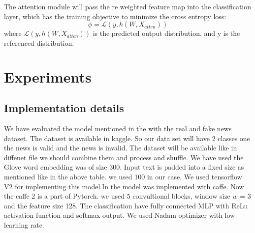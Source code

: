\documentclass{MX2020}
\begin{document}
The attention module will pass the re weighted feature map into the classification layer, which has the training objective to minimize the cross entropy loss: \[\phi = \mathcal{L}(y,h(W, X_{atten}))\]
where \(\mathcal{L}(y,h(W, X_{atten}))\) is the predicted output distribution, and y is the referenced distribution. 

\vspace*{10pt}
\section{Experiments}

\subsection{Implementation details}
We have evaluated the model mentioned in the \cite{Shiyao} with the real and fake news dataset. The dataset is available in kaggle. So our data set will have 2 classes one the news is valid and the news is invalid. The dataset will be available like in diffenet file we should combine them and process and shuffle. 
We have used the Glove word embedding was of size 300. Input text is padded into a fixed size as mentioned like in the above table. we used 100 in our case. We used tensorflow V2 for implementing this model.In \cite{Shiyao} the model was implemented with caffe. Now the caffe 2 is a part of Pytorch. we used 5 convultional blocks,  window size \(w\) = 3 and the feature size 128. 
The classification have fully connected MLP with ReLu activation function and softmax output. We used Nadam optimizer with low learning rate. 
\end{document}
